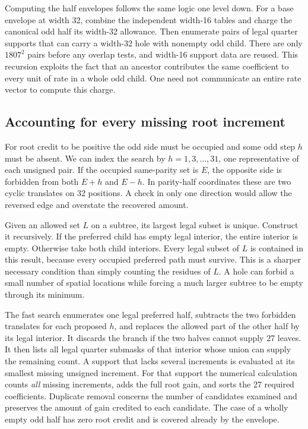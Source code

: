 Computing the half envelopes follows the same logic one level down. For a base envelope at width 32, combine the independent width-16 tables and charge the canonical odd half its width-32 allowance. Then enumerate pairs of legal quarter supports that can carry a width-32 hole with nonempty odd child. There are only \(1807^2\) pairs before any overlap tests, and width-16 support data are reused. This recursion exploits the fact that an ancestor contributes the same coefficient to every unit of rate in a whole odd child. One need not communicate an entire rate vector to compute this charge.

\subsection{Accounting for every missing root increment}

For root credit to be positive the odd side must be occupied and some odd step \(h\) must be absent. We can index the search by \(h=1,3,\ldots,31\), one representative of each unsigned pair. If the occupied same-parity set is \(E\), the opposite side is forbidden from both \(E+h\) and \(E-h\). In parity-half coordinates these are two cyclic translates on 32 positions. A check in only one direction would allow the reversed edge and overstate the recovered amount.

Given an allowed set \(L\) on a subtree, its largest legal subset is unique. Construct it recursively. If the preferred child has empty legal interior, the entire interior is empty. Otherwise take both child interiors. Every legal subset of \(L\) is contained in this result, because every occupied preferred path must survive. This is a sharper necessary condition than simply counting the residues of \(L\). A hole can forbid a small number of spatial locations while forcing a much larger subtree to be empty through its minimum.

The fast search enumerates one legal preferred half, subtracts the two forbidden translates for each proposed \(h\), and replaces the allowed part of the other half by its legal interior. It discards the branch if the two halves cannot supply 27 leaves. It then lists all legal quarter submasks of that interior whose union can supply the remaining count. A support that lacks several increments is evaluated at its smallest missing unsigned increment. For that support the numerical calculation counts \emph{all} missing increments, adds the full root gain, and sorts the 27 required coefficients. Duplicate removal concerns the number of candidates examined and preserves the amount of gain credited to each candidate. The case of a wholly empty odd half has zero root credit and is covered already by the envelope.

